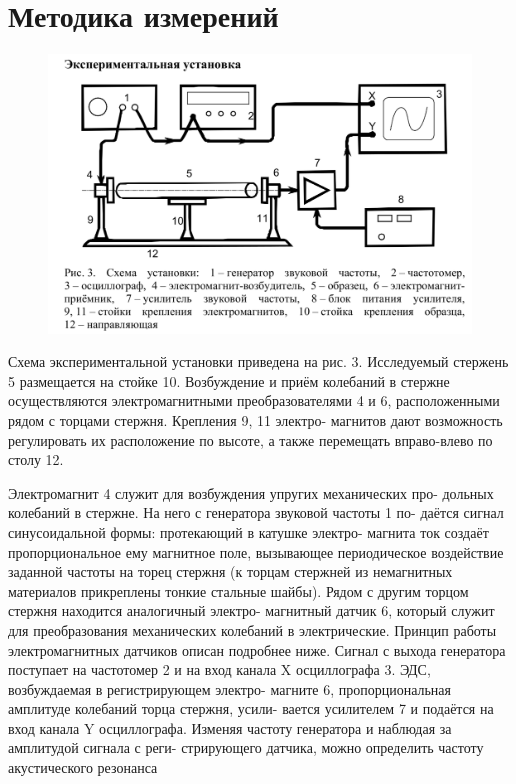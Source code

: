 \documentclass[a4, 12pt]{article}
\begin{document}
\section{Методика измерений}
\begin{figure}[H]
    \centering
    \includegraphics[scale = 1.5]{stand.png}
\end{figure}
Схема экспериментальной установки приведена на рис. 3. Исследуемый
стержень 5 размещается на стойке 10. Возбуждение и приём колебаний в
стержне осуществляются электромагнитными преобразователями 4 и 6,
расположенными рядом с торцами стержня. Крепления 9, 11 электро-
магнитов дают возможность регулировать их расположение по высоте, а
также перемещать вправо-влево по столу 12.
\par Электромагнит 4 служит для возбуждения упругих механических про-
дольных колебаний в стержне. На него с генератора звуковой частоты 1 по-
даётся сигнал синусоидальной формы: протекающий в катушке электро-
магнита ток создаёт пропорциональное ему магнитное поле, вызывающее
периодическое воздействие заданной частоты на торец стержня (к торцам
стержней из немагнитных материалов прикреплены тонкие стальные
шайбы). Рядом с другим торцом стержня находится аналогичный электро-
магнитный датчик 6, который служит для преобразования механических
колебаний в электрические. Принцип работы электромагнитных датчиков
описан подробнее ниже.
Сигнал с выхода генератора поступает на частотомер 2 и на вход
канала X осциллографа 3. ЭДС, возбуждаемая в регистрирующем электро-
магните 6, пропорциональная амплитуде колебаний торца стержня, усили-
вается усилителем 7 и подаётся на вход канала Y осциллографа.
Изменяя частоту генератора и наблюдая за амплитудой сигнала с реги-
стрирующего датчика, можно определить частоту акустического резонанса
\end{document}
